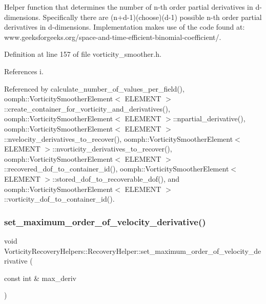 Helper function that determines the number of n-\/th order partial derivatives in d-\/dimensions. Specifically there are (n+d-\/1)(choose)(d-\/1) possible n-\/th order partial derivatives in d-\/dimensions. Implementation makes use of the code found at\+: www.\+geeksforgeeks.\+org/space-\/and-\/time-\/efficient-\/binomial-\/coefficient/. 



Definition at line 157 of file vorticity\+\_\+smoother.\+h.



References i.



Referenced by calculate\+\_\+number\+\_\+of\+\_\+values\+\_\+per\+\_\+field(), oomph\+::\+Vorticity\+Smoother\+Element$<$ E\+L\+E\+M\+E\+N\+T $>$\+::create\+\_\+container\+\_\+for\+\_\+vorticity\+\_\+and\+\_\+derivatives(), oomph\+::\+Vorticity\+Smoother\+Element$<$ E\+L\+E\+M\+E\+N\+T $>$\+::npartial\+\_\+derivative(), oomph\+::\+Vorticity\+Smoother\+Element$<$ E\+L\+E\+M\+E\+N\+T $>$\+::nvelocity\+\_\+derivatives\+\_\+to\+\_\+recover(), oomph\+::\+Vorticity\+Smoother\+Element$<$ E\+L\+E\+M\+E\+N\+T $>$\+::nvorticity\+\_\+derivatives\+\_\+to\+\_\+recover(), oomph\+::\+Vorticity\+Smoother\+Element$<$ E\+L\+E\+M\+E\+N\+T $>$\+::recovered\+\_\+dof\+\_\+to\+\_\+container\+\_\+id(), oomph\+::\+Vorticity\+Smoother\+Element$<$ E\+L\+E\+M\+E\+N\+T $>$\+::stored\+\_\+dof\+\_\+to\+\_\+recoverable\+\_\+dof(), and oomph\+::\+Vorticity\+Smoother\+Element$<$ E\+L\+E\+M\+E\+N\+T $>$\+::vorticity\+\_\+dof\+\_\+to\+\_\+container\+\_\+id().

\mbox{\label{classVorticityRecoveryHelpers_1_1RecoveryHelper_a12d852f0b0ce7a213fb0e671ea23fa6a}} 
\subsubsection{\texorpdfstring{set\+\_\+maximum\+\_\+order\+\_\+of\+\_\+velocity\+\_\+derivative()}{set\_maximum\_order\_of\_velocity\_derivative()}}
{\footnotesize\ttfamily void Vorticity\+Recovery\+Helpers\+::\+Recovery\+Helper\+::set\+\_\+maximum\+\_\+order\+\_\+of\+\_\+velocity\+\_\+derivative (\begin{DoxyParamCaption}\item[{const int \&}]{max\+\_\+deriv }\end{DoxyParamCaption})\hspace{0.3cm}{\ttfamily [inline]}}



